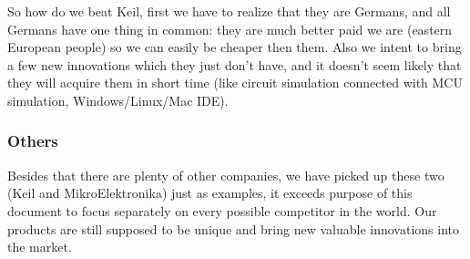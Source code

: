 \documentclass[a4paper,twoside,15pt]{book}
\begin{document}
			So how do we beat Keil, first we have to realize that they are Germans, and all Germans have one thing in common: they are much better paid we are (eastern European people) so we can easily be cheaper then them. Also we intent to bring a few new innovations which they just don't have, and it doesn't seem likely that they will acquire them in short time (like circuit simulation connected with MCU simulation, Windows/Linux/Mac IDE).

		\subsubsection{Others}
			Besides that there are plenty of other companies, we have picked up these two (Keil and MikroElektronika) just as examples, it exceeds purpose of this document to focus separately on every possible competitor in the world. Our products are still supposed to be unique and bring new valuable innovations into the market.

	\clearpage
\end{document}
